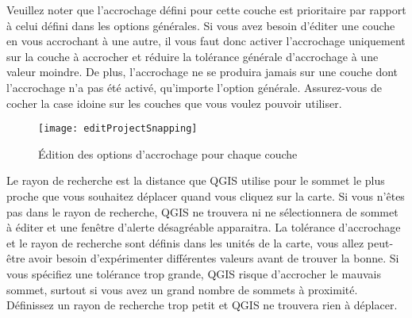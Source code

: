 \begin{itemize}

Veuillez noter que l'accrochage défini pour cette couche est prioritaire par rapport à celui défini dans les options générales. Si vous avez besoin d'éditer une couche en vous accrochant à une autre, il vous faut donc activer l'accrochage uniquement sur la couche à accrocher et réduire la tolérance générale d'accrochage à une valeur moindre. De plus, l'accrochage ne se produira jamais sur une couche dont l'accrochage n'a pas été activé, qu'importe l'option générale. Assurez-vous de cocher la case idoine sur les couches que vous voulez pouvoir utiliser.

\begin{figure}[H]
  \begin{center}
  \caption{Édition des options d'accrochage pour chaque couche \nixcaption}\label{fig:snappingoptions}\smallskip
  \texttt{[image: editProjectSnapping]}
\end{center}
\end{figure}


Le rayon de recherche est la distance que QGIS utilise pour  le sommet le plus proche que vous souhaitez déplacer quand vous cliquez sur la carte. Si vous n'êtes pas dans le rayon de recherche, QGIS ne trouvera ni ne sélectionnera de sommet à éditer et une fenêtre d'alerte désagréable apparaitra. La tolérance d'accrochage et le rayon de recherche sont définis dans les unités de la carte, vous allez peut-être avoir besoin d'expérimenter différentes valeurs avant de trouver la bonne. Si vous spécifiez une tolérance trop grande, QGIS risque d'accrocher le mauvais sommet, surtout si vous avez un grand nombre de sommets à proximité. Définissez un rayon de recherche trop petit et QGIS ne trouvera rien à déplacer.


\end{itemize}
